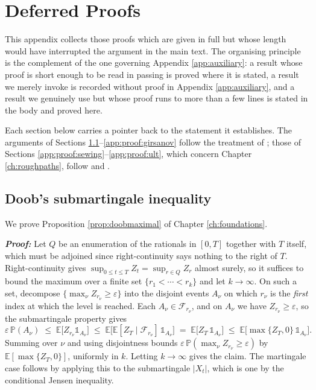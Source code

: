 \chapter{Deferred Proofs}\label{app:proofs}

This appendix collects those proofs which are given in full but whose length would have interrupted
the argument in the main text. The organising principle is the complement of the one governing
Appendix \ref{app:auxiliary}: a result whose proof is short enough to be read in passing is proved
where it is stated, a result we merely invoke is recorded without proof in Appendix
\ref{app:auxiliary}, and a result we genuinely use but whose proof runs to more than a few lines is
stated in the body and proved here.

Each section below carries a pointer back to the statement it establishes. The arguments of
Sections \ref{app:proof:doobmaximal}--\ref{app:proof:girsanov} follow the treatment of
\cite{kuo2006}; those of Sections \ref{app:proof:sewing}--\ref{app:proof:ult}, which concern
Chapter \ref{ch:roughpaths}, follow \cite{frizhairer2020} and \cite{geng2021}.

\section{Doob's submartingale inequality}\label{app:proof:doobmaximal}
We prove Proposition \ref{prop:doobmaximal} of Chapter \ref{ch:foundations}.

\textbf{\textit{Proof:}} Let $Q$ be an enumeration of the rationals in $[0,T]$ together with $T$
itself, which must be adjoined since right-continuity says nothing to the right of $T$. Right-continuity gives
$\sup_{0\leq t\leq T} Z_t = \sup_{r \in Q} Z_r$ almost surely, so it suffices to bound the maximum
over a finite set $\{r_1 < \cdots < r_k\}$ and let $k \to \infty$. On such a set, decompose
$\{\max_\nu Z_{r_\nu} \geq \varepsilon\}$ into the disjoint events $A_\nu$ on which $r_\nu$ is the
\emph{first} index at which the level is reached. Each $A_\nu \in \mathcal{F}_{r_\nu}$, and on
$A_\nu$ we have $Z_{r_\nu} \geq \varepsilon$, so the submartingale property gives
\[
\varepsilon\,\mathbb{P}(A_\nu) \;\leq\; \mathbb{E}\bigl[Z_{r_\nu}\mathds{1}_{A_\nu}\bigr]
\;\leq\; \mathbb{E}\bigl[\mathbb{E}[Z_T \mid \mathcal{F}_{r_\nu}]\,\mathds{1}_{A_\nu}\bigr]
\;=\; \mathbb{E}\bigl[Z_T\,\mathds{1}_{A_\nu}\bigr] \;\leq\; \mathbb{E}\bigl[\max\{Z_T,0\}\,\mathds{1}_{A_\nu}\bigr].
\]
Summing over $\nu$ and using disjointness bounds $\varepsilon\,\mathbb{P}(\max_\nu Z_{r_\nu}\geq\varepsilon)$
by $\mathbb{E}[\max\{Z_T,0\}]$, uniformly in $k$. Letting $k \to \infty$ gives the claim. The
martingale case follows by applying this to the submartingale $|X_t|$, which is one by the
conditional Jensen inequality. \qedfilledtext

